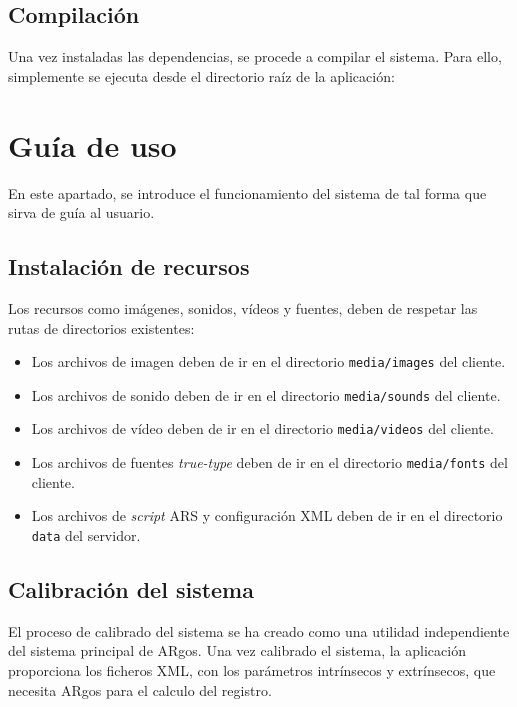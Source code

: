 \subsection{Compilación}

Una vez instaladas las dependencias, se procede a compilar el sistema. Para ello, simplemente se
ejecuta desde el directorio raíz de la aplicación:


\section{Guía de uso}

En este apartado, se introduce el funcionamiento del sistema de tal forma que sirva de guía al
usuario.

\subsection{Instalación de recursos}

Los recursos como imágenes, sonidos, vídeos y fuentes, deben de respetar las rutas de directorios
existentes:

\begin{itemize}
\item Los archivos de imagen deben de ir en el directorio \texttt{media/images} del cliente.
\item Los archivos de sonido deben de ir en el directorio \texttt{media/sounds} del cliente.
\item Los archivos de vídeo deben de ir en el directorio \texttt{media/videos} del cliente.
\item Los archivos de fuentes \textit{true-type} deben de ir en el directorio \texttt{media/fonts}
  del cliente.
\item Los archivos de \textit{script} ARS y configuración XML deben de ir en el
  directorio \texttt{data} del servidor.
\end{itemize}

\subsection{Calibración del sistema}

El proceso de calibrado del sistema se ha creado como una utilidad independiente del sistema
principal de ARgos. Una vez calibrado el sistema, la aplicación proporciona los ficheros XML, con
los parámetros intrínsecos y extrínsecos, que necesita ARgos para el calculo del registro.

